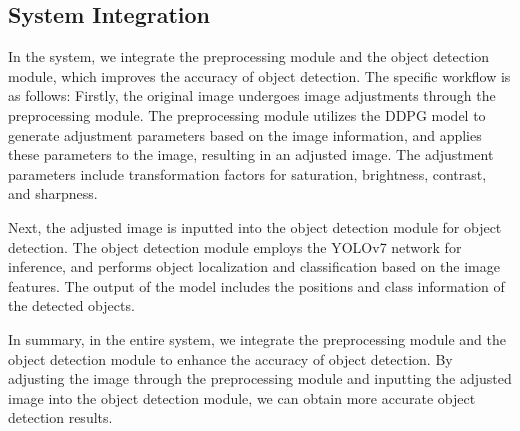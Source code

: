\documentclass[PhD]{PHlab-thesis}
\begin{document}
\subsection{System Integration}
In the system, we integrate the preprocessing module and the object detection module, which improves the accuracy of object detection. The specific workflow is as follows: Firstly, the original image undergoes image adjustments through the preprocessing module. The preprocessing module utilizes the DDPG model to generate adjustment parameters based on the image information, and applies these parameters to the image, resulting in an adjusted image. The adjustment parameters include transformation factors for saturation, brightness, contrast, and sharpness.

Next, the adjusted image is inputted into the object detection module for object detection. The object detection module employs the YOLOv7 network for inference, and performs object localization and classification based on the image features. The output of the model includes the positions and class information of the detected objects.

In summary, in the entire system, we integrate the preprocessing module and the object detection module to enhance the accuracy of object detection. By adjusting the image through the preprocessing module and inputting the adjusted image into the object detection module, we can obtain more accurate object detection results. 
\end{document}

